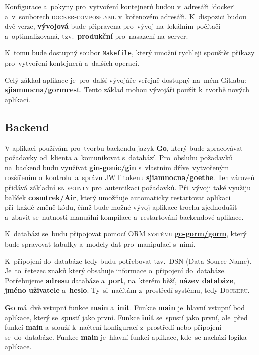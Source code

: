 \documentclass[14pt,a4paper]{article}
\begin{document}
        Konfigurace a~pokyny pro~vytvoření kontejnerů budou v~adresáři `docker` a~v~souborech \textsc{docker-compose.yml} v~kořenovém adresáři. K~dispozici budou dvě verze, \textbf{vývojová} bude připravena pro~vývoj na~lokálním počítači a~optimalizovaná, tzv.~\textbf{produkční} pro~nasazení na~server.

        K~tomu bude dostupný soubor \texttt{Makefile}, který umožní rychleji spouštět příkazy pro~vytvoření kontejnerů a~dalších operací.

        Celý základ aplikace je~pro~další vývojáře veřejně dostupný na~mém Gitlabu: \href{https://gitlab.com/sjiamnocna/gormrest}{\textbf{sjiamnocna/gormrest}}. Tento základ mohou vývojáři použít k~tvorbě nových aplikací.
        
        \subsection{Backend}
            V aplikaci používám pro~tvorbu backendu jazyk \textbf{Go}, který bude zpracovávat požadavky od~klienta a~komunikovat s~databází.
            Pro~obsluhu požadavků na~backend budu využívat \href{https://github.com/gin-gonic/gin}{\textbf{gin-gonic/gin}} s~vlastním dříve~vytvořeným rozšířením o~kontrolu~a~správu \textsc{JWT} tokenu \href{https://gitlab.com/sjiamnocna/goethe}{\textbf{sjiamnocna/goethe}}. Ten zároveň přidává základní \textsc{endpointy} pro~autentikaci požadavků.
            Při~vývoji také využiju balíček \href{https://github.com/cosmtrek/air}{\textbf{cosmtrek/Air}}, který umožňuje automaticky restartovat aplikaci při~každé změně kódu, čímž bude možné vývoj aplikace trochu zjednodušit a~zbavit se~nutnosti manuální kompilace a~restartování backendové aplikace.

            K~databázi se~budu připojovat pomocí \textsc{ORM systému} \href{https://gorm.io/}{\textbf{go-gorm/gorm}}, který bude spravovat tabulky a~modely dat pro~manipulaci s~nimi.

            K~připojení do~databáze tedy budu potřebovat tzv.~\textsc{DSN} (Data Source Name). Je~to~řetezec znaků který obsahuje informace o~připojení do~databáze. Potřebujeme \textbf{adresu} databáze a~\textbf{port}, na~kterém běží, \textbf{název databáze}, \textbf{jméno uživatele} a~\textbf{heslo}. Ty~si~načítám z~prostředí systému, tedy \textsc{Dockeru}.

            \textbf{Go} má~dvě vstupní funkce \textbf{main} a~\textbf{init}. Funkce \textbf{main} je~hlavní vstupní bod aplikace, který se~spustí jako první. Funkce \textbf{init} se~spustí jako první, ale~před funkcí \textbf{main} a~slouží k~načtení konfigurací z~prostředí nebo připojení se~do~databáze. Funkce \textbf{main} je~hlavní funkcí aplikace, kde~se nachází logika aplikace.
\end{document}
